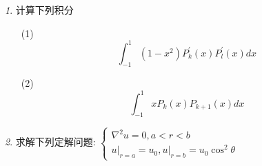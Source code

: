 \documentclass[11pt]{article}
\theoremstyle{remark}
\newtheorem{problem}{}
\begin{document}
\begin{problem}
计算下列积分
\begin{itemize}
  \item[(1)] $$
  \int_{-1}^1\left(1-x^2\right) P_k^{\prime}(x) P_l^{\prime}(x) d x
  $$
  \item[(2)]
  $$
\int_{-1}^1 x P_k(x) P_{k+1}(x) d x
$$
\end{itemize}
\end{problem}

\begin{problem}
  求解下列定解问题: 
  $\left\{\begin{array}{l}
    \nabla^2 u=0, a<r<b \\ 
    \left.u\right|_{r=a}=u_0,\left.u\right|_{r=b}=u_0 \cos ^2 \theta
  \end{array}\right.$
\end{problem}
\end{document}
